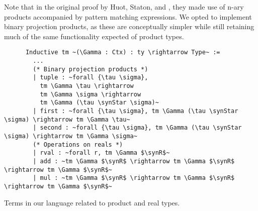   Note that in the original proof by Huot, Staton, and \Vakar{} \cite{huot2020correctness}, they made use of n-ary products accompanied by pattern matching expressions.
  We opted to implement binary projection products, as these are conceptually simpler while still retaining much of the same functionality expected of product types.

  \begin{listing}
    \begin{verbatim}
      Inductive tm ~(\Gamma : Ctx) : ty \rightarrow Type~ :=
        ...
        (* Binary projection products *)
        | tuple : ~forall {\tau \sigma},
          tm \Gamma \tau \rightarrow
          tm \Gamma \sigma \rightarrow
          tm \Gamma (\tau \synStar \sigma)~
        | first : ~forall {\tau \sigma}, tm \Gamma (\tau \synStar \sigma) \rightarrow tm \Gamma \tau~
        | second : ~forall {\tau \sigma}, tm \Gamma (\tau \synStar \sigma) \rightarrow tm \Gamma \sigma~
        (* Operations on reals *)
        | rval : ~forall r, tm \Gamma $\synR$~
        | add : ~tm \Gamma $\synR$ \rightarrow tm \Gamma $\synR$ \rightarrow tm \Gamma $\synR$~
        | mul : ~tm \Gamma $\synR$ \rightarrow tm \Gamma $\synR$ \rightarrow tm \Gamma $\synR$~
    \end{verbatim}
    \caption{Terms in our language related to product and real types.}
    \label{lst:stlc_prod_r}
  \end{listing}





